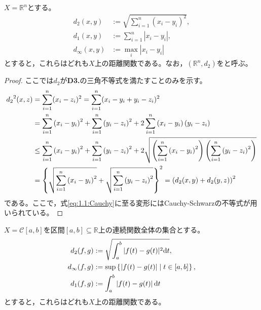 \documentclass{jsarticle}
\begin{document}
\begin{rei}
    $X = \mathbb{R}^{n}$とする。
    \begin{align}
        d_{2} (x,y) &:= \sqrt{\sum_{i=1}^{n} (x_{i} - y_{i})^{2}}, \\
        d_{1} (x,y) &:= \sum_{i=1}^{n} |x_{i} - y_{i}|, \\
        d_{\infty} (x,y) &:= \max_{i} |x_{i} - y_{i}|
    \end{align}
    とすると，これらはどれも$X$上の距離関数である。なお，$(\mathbb{R}^{n}, d_{2})$をと呼ぶ。
\end{rei}
\begin{proof}
    ここでは$d_{2}$が{\bf D3.}の三角不等式を満たすことのみを示す。
    \begin{align}
        {d_{2}}^{2}(x,z)
        &= \sum_{i=1}^{n} (x_{i} - z_{i})^{2} = \sum_{i=1}^{n} (x_{i} - y_{i} + y_{i} - z_{i})^{2} \notag \\
        &= \sum_{i=1}^{n} \left( x_{i} - y_{i} \right)^{2} + \sum_{i=1}^{n} \left( y_{i} - z_{i} \right)^{2} + 2 \sum_{i=1}^{n} \left( x_{i} - y_{i} \right) \left( y_{i} - z_{i} \right) \notag \\
      &\le \sum_{i=1}^{n} \left( x_{i} - y_{i} \right)^{2} + \sum_{i=1}^{n} \left( y_{i} - z_{i} \right)^{2} + 2 \sqrt{\left( \sum_{i=1}^{n} \left( x_{i} - y_{i} \right)^{2} \right) \left( \sum_{i=1}^{n} \left( y_{i} - z_{i} \right)^{2} \right)} \label{eq:1.1:Cauchy}\\
        &= \left\{ \sqrt{\sum_{i=1}^{n} \left( x_{i} - y_{i} \right)^{2}} + \sqrt{\sum_{i=1}^{n} \left( y_{i} - z_{i} \right)^{2}} \right\}^{2}
         = \left( d_{2}(x,y) + d_{2} (y,z) \right)^{2}
    \end{align}
    である。ここで，式\eqref{eq:1.1:Cauchy}に至る変形にはCauchy-Schwarzの不等式が用いられている。
\end{proof}

\begin{rei}
    $X = \mathcal{C} [a,b]$を区間$[a,b] \subseteq \mathbb{R}$上の連続関数全体の集合とする。
    \begin{align}
        d_{2} (f,g) &:= \sqrt{ \int_{a}^{b} | f(t) - g(t) | ^{2} \mathrm{d}t}, \\
        d_{\infty} (f,g) &:= \sup \Set{\hspace{-1.8pt}  \left| f(t) - g(t) \right| | t \in [a,b] \hspace{-1.8pt}}, \\
        d_{1} (f,g) &:= \int_{a}^{b} \left| f(t) - g(t) \right| \mathrm{d}t
    \end{align}
    とすると，これらはどれも$X$上の距離関数である。
\end{rei}
\end{document}
